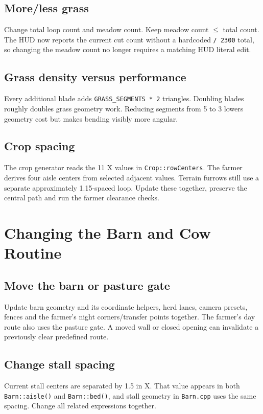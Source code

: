 \documentclass[11pt,a4paper,openany]{book}
\newcommand{\code}[1]{\texttt{#1}}
\newcommand{\file}[1]{\nolinkurl{#1}}
\begin{document}
\section{More/less grass}
Change total loop count and meadow count. Keep meadow count \(\le\) total count. The HUD now reports the current cut count without a hardcoded \code{/ 2300} total, so changing the meadow count no longer requires a matching HUD literal edit.

\section{Grass density versus performance}
Every additional blade adds \code{GRASS_SEGMENTS * 2} triangles. Doubling blades roughly doubles grass geometry work. Reducing segments from 5 to 3 lowers geometry cost but makes bending visibly more angular.

\section{Crop spacing}
The crop generator reads the 11 X values in \code{Crop::rowCenters}. The farmer derives four aisle centers from selected adjacent values. Terrain furrows still use a separate approximately 1.15-spaced loop. Update these together, preserve the central path and run the farmer clearance checks.

\chapter{Changing the Barn and Cow Routine}
\section{Move the barn or pasture gate}
Update barn geometry and its coordinate helpers, herd lanes, camera presets, fences and the farmer's night corners/transfer points together. The farmer's day route also uses the pasture gate. A moved wall or closed opening can invalidate a previously clear predefined route.

\section{Change stall spacing}
Current stall centers are separated by 1.5 in X. That value appears in both \code{Barn::aisle()} and \code{Barn::bed()}, and stall geometry in \file{Barn.cpp} uses the same spacing. Change all related expressions together.
\end{document}

